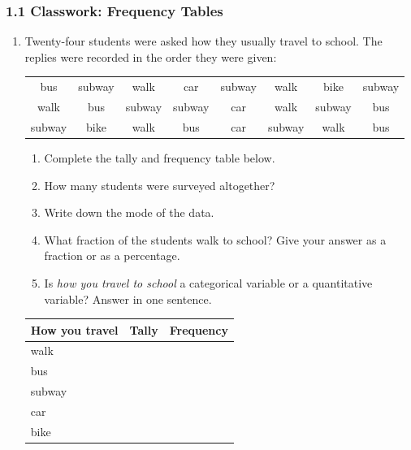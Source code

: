 \documentclass[12pt, twoside]{article}
\begin{document}
\subsubsection*{1.1 Classwork: Frequency Tables}

\begin{enumerate}[itemsep=0.15cm]

\item[1.]

Twenty-four students were asked how they usually travel to school.
The replies were recorded in the order they were given:

{\setlength{\tabcolsep}{4pt}
\begin{center}
\begin{tabular}{cccccccc}
bus & subway & walk & car & subway & walk & bike & subway \\
walk & bus & subway & subway & car & walk & subway & bus \\
subway & bike & walk & bus & car & subway & walk & bus \\
\end{tabular}
\end{center}}

\begin{enumerate}[itemsep=0.05cm]
  \item Complete the tally and frequency table below.
  \item How many students were surveyed altogether?
  \item Write down the mode of the data.
  \item What fraction of the students walk to school? Give your answer
  as a fraction or as a percentage.
  \item Is \emph{how you travel to school} a categorical variable or a
  quantitative variable? Answer in one sentence.
\end{enumerate}

{\renewcommand{\arraystretch}{2.0}
\begin{center}
\begin{tabular}{|l|p{6cm}|c|}
\hline
\textbf{How you travel} & \hfil \textbf{Tally} & \textbf{Frequency} \\ \hline
walk   & & \\ \hline
bus    & & \\ \hline
subway & & \\ \hline
car    & & \\ \hline
bike   & & \\ \hline
\end{tabular}
\end{center}}


\end{enumerate}
\end{document}
